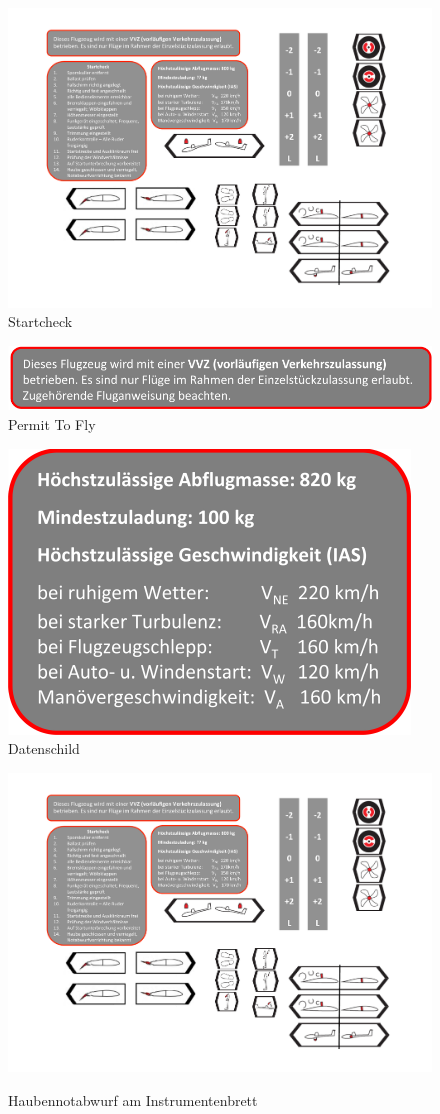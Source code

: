 \begin{figure}[h]
\begin{center}
\includegraphics[width=.45\textwidth]{bilder/startcheck.pdf}
\caption*{Startcheck}
\end{center}
\end{figure}

\begin{figure}[h]
\begin{center}
\includegraphics[width=.9\textwidth]{bilder/vvz.pdf}
\caption*{Permit To Fly}
\end{center}
\end{figure}

\begin{figure}[H]
\begin{center}
\includegraphics[width=.45\textwidth]{bilder/datenschild.pdf}
\caption*{Datenschild}
\end{center}
\end{figure}

\begin{figure}[H]
\begin{center}
\includegraphics[width=.15\textwidth]{bilder/notabwurf.pdf}\\
\caption*{Haubennotabwurf am Instrumentenbrett}
\end{center}
\end{figure}

